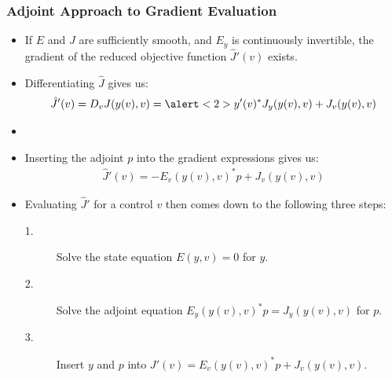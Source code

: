 \documentclass[9pt]{beamer}
\begin{document}
\begin{frame}
\frametitle{Adjoint Approach to Gradient Evaluation}
\begin{itemize}
\item<1->{If $E$ and $J$ are sufficiently smooth, and $E_y$ is continuously invertible, the gradient of the reduced objective function $\hat J'(v)$ exists.}
\item<1->{Differentiating $\hat J$ gives us: 
\begin{align*}
\hat J'(v)=D_vJ(y(v),v)=\alert<2>{y'(v)^*}J_y(y(v),v)+J_v(y(v),v)
\end{align*}}
\item<3->{ 
}
\item<7->{Inserting the adjoint $p$ into the gradient expressions gives us:
\begin{align*}
\hat J'(v) = -E_v(y(v),v)^*p+J_v(y(v),v)
\end{align*}}
\item<8->{Evaluating $\hat J'$ for a control $v$ then comes down to the following three steps:
\begin{description}
\item[1.]{Solve the state equation $E(y,v)=0$ for $y$.}
\item[2.]{Solve the adjoint equation $E_y(y(v),v)^*p = J_y(y(v),v)$ for $p$.}
\item[3.]{Insert $y$ and $p$ into $J'(v)=E_v(y(v),v)^*p +J_v(y(v),v)$.}
\end{description}}
\end{itemize}
\end{frame}
\end{document}
